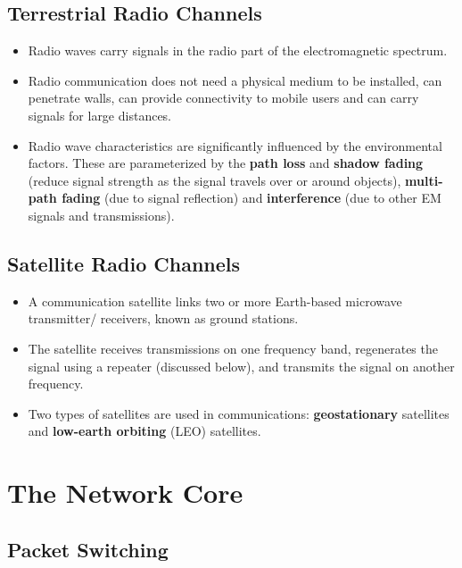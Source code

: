 \documentclass{article}
\theoremstyle{plain}
\theoremstyle{definition}
\begin{document}
\subsection{Terrestrial Radio Channels}
\begin{itemize}
    \item Radio waves carry signals in the radio part of the electromagnetic spectrum. 
    
    \item Radio communication does not need a physical medium to be installed, can penetrate walls, can provide connectivity to mobile users and can carry signals for large distances. 
    
    \item Radio wave characteristics are significantly influenced by the environmental factors. These are parameterized by the \textbf{path loss} and \textbf{shadow fading} (reduce signal strength as the signal travels over or around objects), \textbf{multi-path fading} (due to signal reflection) and \textbf{interference} (due to other EM signals and transmissions). 
\end{itemize}

\subsection{Satellite Radio Channels}
\begin{itemize}
    \item A communication satellite links two or more Earth-based microwave transmitter/ receivers, known as ground stations. 
    
    \item The satellite receives transmissions on one frequency
band, regenerates the signal using a repeater (discussed below), and transmits
the signal on another frequency. 

    \item Two types of satellites are used in communications: \textbf{geostationary} satellites and \textbf{low-earth orbiting} (LEO) satellites.
\end{itemize}


\section{The Network Core}
\subsection{Packet Switching}
\end{document}
